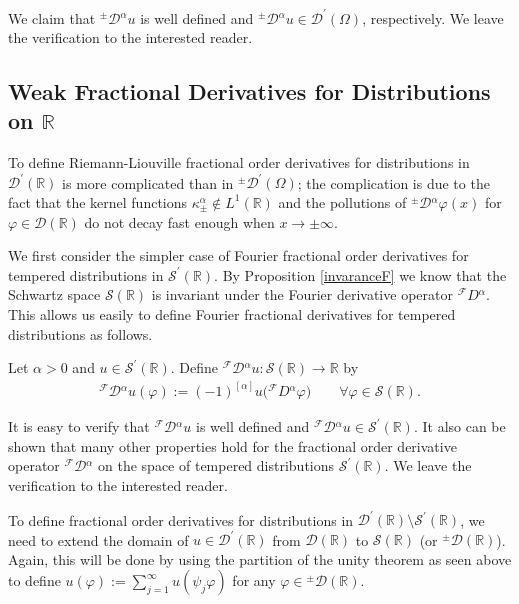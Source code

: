 \documentclass[leqno,final]{siamltex}
\numberwithin{equation}{section}
\renewcommand{\(}{\bigl(}
\renewcommand{\)}{\bigr)}
\newcommand{\R}{\mathbb{R}}
\begin{document}
We claim that ${^{\pm}}{\mathcal{D}}{^{\alpha}} u$ is well defined and ${^{\pm}}{\mathcal{D}}{^{\alpha}} u \in  {\mathscr{D}}^\prime (\Omega)$, respectively.
We leave the verification to the interested reader.

  
  \subsection{Weak Fractional Derivatives for Distributions on $\R$}\label{sec-6.4}
  To define Riemann-Liouville fractional order derivatives for distributions in ${\mathscr{D}}^\prime (\R)$ is more 
  complicated than in ${^{\pm}}{\mathscr{D}}^\prime (\Omega)$; the complication is due
  to the fact that the kernel functions $\kappa_{\pm}^{\alpha} \not\in L^1(\R)$ and the pollutions of ${^{\pm}}{\mathcal{D}}{^{\alpha}}\varphi(x)$ for $\varphi\in \mathscr{D}(\R)$ do not decay fast enough 
  when $x\to \pm \infty$. 
  
  We first consider the simpler case of Fourier fractional order derivatives for tempered distributions 
  in $\mathcal{S}^\prime(\R)$. By Proposition \ref{invaranceF} we know that the Schwartz space $\mathcal{S}(\R)$ 
  is invariant under the Fourier derivative operator ${^{\mathcal{F}}}{D}{^{\alpha}}$. This allows us easily 
  to define  Fourier fractional derivatives for tempered distributions as follows.
  
  \begin{definition}
 	Let $ \alpha >0$ and  $u \in  {\mathcal{S}}^\prime (\R) $. 
 	Define ${^{\mathcal{F}}}{\mathcal{D}}{^{\alpha}} u:  \mathcal{S}(\R) \to \R$ by  
 	\begin{align}\label{eq6.5}
 	 {^{\mathcal{F}}}{\mathcal{D}}{^{\alpha}} u  (\varphi):=  
 	(-1)^{[\alpha]} u \bigl( {^{\mathcal{F}}}{D}{^{\alpha}} \varphi \bigr)  
 	\qquad \forall \varphi \in  \mathcal{S}(\R).
 	\end{align} 
\end{definition}
  
It is easy to verify that ${^{\mathcal{F}}}{\mathcal{D}}{^{\alpha}} u$ is well defined and 
${^{\mathcal{F}}}{\mathcal{D}}{^{\alpha}} u \in \mathcal{S}^\prime(\R)$. It also can be shown that 
many other properties hold for the fractional order derivative operator ${^{\mathcal{F}}}{\mathcal{D}}{^{\alpha}}$ 
on the space of tempered distributions ${\mathcal{S}}^\prime (\R)$. We leave the verification to 
the interested reader.   
 
 
To define fractional order derivatives for distributions in
${\mathscr{D}}^\prime (\R)\setminus {\mathcal{S}}^\prime (\R)$, we need to extend the domain 
of $u\in {\mathscr{D}}^\prime (\R)$ from ${\mathscr{D}}(\R)$ to ${\mathcal{S}}(\R)$ (or  ${^{\pm}}{\mathscr{D}}(\R)$). 
Again, this will be done by using the partition of the unity theorem as seen above 
to define 
$u (\varphi):= \sum_{j = 1}^{\infty} u( \psi_j  \varphi)$ for any $\varphi \in  {^{\pm}}{\mathscr{D}}(\R)$.
\end{document}
